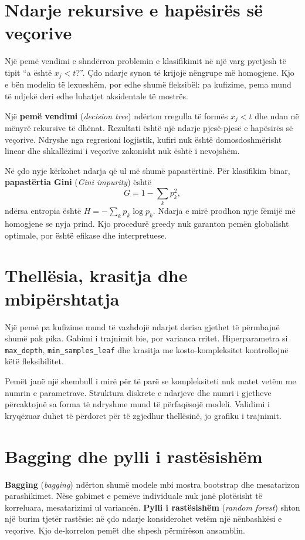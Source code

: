 \documentclass[12pt,a4paper,oneside]{book}
\newcommand{\term}[2]{\textbf{#1} (\textit{#2})}
\begin{document}
\section{Ndarje rekursive e hapësirës së veçorive}

Një pemë vendimi e shndërron problemin e klasifikimit në një varg pyetjesh të tipit ``a është $x_j<t$?''. Çdo ndarje synon të krijojë nëngrupe më homogjene. Kjo e bën modelin të lexueshëm, por edhe shumë fleksibël: pa kufizime, pema mund të ndjekë deri edhe luhatjet aksidentale të mostrës.

Një \term{pemë vendimi}{decision tree} ndërton rregulla të formës $x_j<t$ dhe ndan në mënyrë rekursive të dhënat. Rezultati është një ndarje pjesë-pjesë e hapësirës së veçorive. Ndryshe nga regresioni logjistik, kufiri nuk është domosdoshmërisht linear dhe shkallëzimi i veçorive zakonisht nuk është i nevojshëm.

Në çdo nyje kërkohet ndarja që ul më shumë papastërtinë. Për klasifikim binar, \term{papastërtia Gini}{Gini impurity} është
\[
G=1-\sum_k p_k^2,
\]
ndërsa entropia është $H=-\sum_k p_k\log p_k$. Ndarja e mirë prodhon nyje fëmijë më homogjene se nyja prind. Kjo procedurë greedy nuk garanton pemën globalisht optimale, por është efikase dhe interpretuese.

\section{Thellësia, krasitja dhe mbipërshtatja}

Një pemë pa kufizime mund të vazhdojë ndarjet derisa gjethet të përmbajnë shumë pak pika. Gabimi i trajnimit bie, por varianca rritet. Hiperparametra si \texttt{max\_depth}, \texttt{min\_samples\_leaf} dhe krasitja me kosto-kompleksitet kontrollojnë këtë fleksibilitet.

Pemët janë një shembull i mirë për të parë se kompleksiteti nuk matet vetëm me numrin e parametrave. Struktura diskrete e ndarjeve dhe numri i gjetheve përcaktojnë sa forma të ndryshme mund të përfaqësojë modeli. Validimi i kryqëzuar duhet të përdoret për të zgjedhur thellësinë, jo grafiku i trajnimit.

\section{Bagging dhe pylli i rastësishëm}

\term{Bagging}{bagging} ndërton shumë modele mbi mostra bootstrap dhe mesatarizon parashikimet. Nëse gabimet e pemëve individuale nuk janë plotësisht të korreluara, mesatarizimi ul variancën. \term{Pylli i rastësishëm}{random forest} shton një burim tjetër rastësie: në çdo ndarje konsiderohet vetëm një nënbashkësi e veçorive. Kjo de-korrelon pemët dhe shpesh përmirëson ansamblin.
\end{document}
